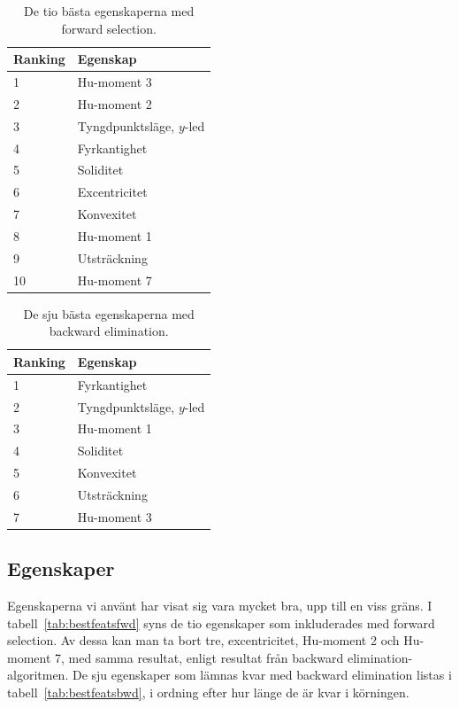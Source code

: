 \documentclass[../rapport_MVEX01-11-05]{subfiles}
\begin{document}
\begin{table}[tb]
	\centering
	\caption{De tio bästa egenskaperna med forward selection.}
	
	\label{tab:bestfeatsfwd}
	\begin{tabular}{ll}
		\toprule
		Ranking & Egenskap \\
		\midrule
		1 & Hu-moment 3 \\
		2 & Hu-moment 2 \\
		3 & Tyngdpunktsläge, $y$-led \\
		4 & Fyrkantighet \\
		5 & Soliditet \\
		6 & Excentricitet \\
		7 & Konvexitet \\
		8 & Hu-moment 1 \\
		9 & Utsträckning \\
		10 & Hu-moment 7 \\
		\bottomrule
	\end{tabular}
\end{table}

\begin{table}[tb]
	\centering
    \caption{De sju bästa egenskaperna med backward elimination.}
	
	\label{tab:bestfeatsbwd}
	\begin{tabular}{ll}
		\toprule
		Ranking & Egenskap \\
		\midrule
                1 & Fyrkantighet \\
                2 & Tyngdpunktsläge, $y$-led \\
                3 & Hu-moment 1\\
                4 & Soliditet\\
                5 & Konvexitet \\
                6 & Utsträckning \\
                7 & Hu-moment 3 \\
		\bottomrule
	\end{tabular}
\end{table}

\subsection{Egenskaper}\label{sec:resultat_features}

Egenskaperna vi använt har visat sig vara mycket bra, upp till en viss gräns.
I tabell~\vref{tab:bestfeatsfwd} syns de tio egenskaper som inkluderades
med forward selection. Av dessa kan man ta bort tre, excentricitet,
Hu-moment 2 och Hu-moment 7,
med samma resultat, enligt resultat från backward
elimination-algoritmen. De sju egenskaper som lämnas kvar med
backward elimination listas i tabell~\vref{tab:bestfeatsbwd}, i
ordning efter hur länge de är kvar i körningen.
\end{document}
